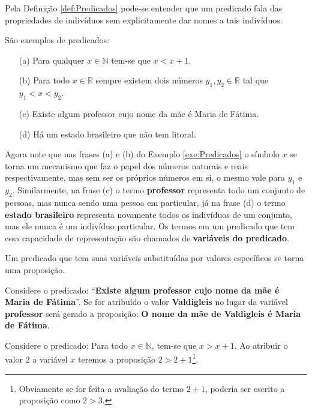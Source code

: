 Pela Definição \ref{def:Predicados} pode-se entender que um predicado fala das propriedades de indivíduos sem explicitamente dar nomes a tais indivíduos.

\begin{exemplo}\label{exe:Predicados}
	São exemplos de predicados:
	\begin{itemize}
		\item[(a)] Para qualquer $x \in \mathbb{N}$ tem-se que $x < x + 1$.
		\item[(b)] Para todo $x \in \mathbb{R}$ sempre existem dois números $y_1, y_2 \in \mathbb{R}$ tal que $y_1 < x < y_2$.
		\item[(c)] Existe algum professor cujo nome da mãe é Maria de Fátima.
		\item[(d)] Há um estado brasileiro que não tem litoral.
	\end{itemize}
\end{exemplo}

Agora note que nas frases (a) e (b) do Exemplo \ref{exe:Predicados} o símbolo $x$ se torna um mecanismo que faz o papel dos números naturais e reais respectivamente, mas sem ser os próprios números em si, o mesmo vale para $y_1$ e $y_2$. Similarmente, na frase (c) o termo \textbf{professor} representa todo um conjunto de pessoas, mas nunca sendo uma pessoa em particular, já na frase (d) o termo \textbf{estado brasileiro} representa novamente todos os indivíduos de um conjunto, mas ele nunca é um indivíduo particular. Os termos em um predicado que tem essa capacidade de representação são chamados de \textbf{variáveis do predicado}.

\begin{nota}
	Um predicado que tem suas variáveis substituídas por valores específicos se torna uma proposição.
\end{nota}

\begin{exemplo}\label{exe:AtribuirVariavelPredicado1}
	Considere o predicado: ``\textbf{Existe algum professor cujo nome da mãe é Maria de Fátima}''. Se for atribuído o valor \textbf{Valdigleis} no lugar da variável \textbf{professor} será gerado a proposição: \textbf{O nome da mãe de Valdigleis é Maria de Fátima}.
\end{exemplo}

\begin{exemplo}\label{exe:AtribuirVariavelPredicado2}
	Considere o predicado: Para todo $x \in \mathbb{N}$, tem-se que $x > x + 1$. Ao atribuir o valor $2$ a variável $x$ teremos a proposição $2 > 2 + 1$\footnote{Obviamente se for feita a avaliação do termo $2 + 1$, poderia ser escrito a proposição como $2 > 3$.}.
\end{exemplo}

